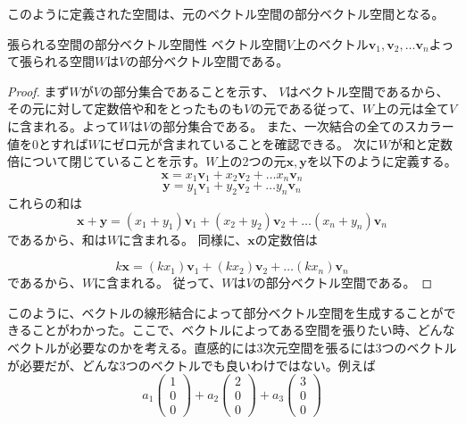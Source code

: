 このように定義された空間は、元のベクトル空間の部分ベクトル空間となる。
\begin{theorem*}{張られる空間の部分ベクトル空間性}
	ベクトル空間\(V\)上のベクトル\(\boldsymbol{v}_1,\boldsymbol{v}_2,\dots\boldsymbol{v}_n\)よって張られる空間\(W\)は\(V\)の部分ベクトル空間である。
\end{theorem*}
\begin{proof}
	まず\(W\)が\(V\)の部分集合であることを示す、
	\(V\)はベクトル空間であるから、その元に対して定数倍や和をとったものも\(V\)の元である従って、\(W\)上の元は全て\(V\)に含まれる。よって\( W\)は\(V\)の部分集合である。
	また、一次結合の全てのスカラー値を0とすれば\(W\)にゼロ元が含まれていることを確認できる。
	次に\( W\)が和と定数倍について閉じていることを示す。\(W\)上の2つの元\(\boldsymbol{x},\boldsymbol{y}\)を以下のように定義する。
	\begin{equation}
		\boldsymbol{x}=x_1\boldsymbol{v}_1+x_2\boldsymbol{v}_2+\dots x_n\boldsymbol{v}_n
	\end{equation}
	\begin{equation}
		\boldsymbol{y}=y_1\boldsymbol{v}_1+y_2\boldsymbol{v}_2+\dots y_n\boldsymbol{v}_n
	\end{equation}
	これらの和は
	\begin{equation}
		\boldsymbol{x}+\boldsymbol{y}=(x_1+y_1)\boldsymbol{v}_1+(x_2+y_2)\boldsymbol{v}_2+\dots (x_n+y_n)\boldsymbol{v}_n
	\end{equation}
	であるから、和は\(W\)に含まれる。
	同様に、\(\boldsymbol{x}\)の定数倍は

	\begin{equation}
		k\boldsymbol{x}=(kx_1)\boldsymbol{v}_1+(kx_2)\boldsymbol{v}_2+\dots (kx_n)\boldsymbol{v}_n
	\end{equation}
	であるから、\(W\)に含まれる。
	従って、\( W\)は\(V\)の部分ベクトル空間である。
\end{proof}
このように、ベクトルの線形結合によって部分ベクトル空間を生成することができることがわかった。ここで、ベクトルによってある空間を張りたい時、どんなベクトルが必要なのかを考える。直感的には3次元空間を張るには3つのベクトルが必要だが、どんな3つのベクトルでも良いわけではない。例えば
\begin{equation}
	a_1 \begin{pmatrix} 1 \\0 \\ 0 \end{pmatrix}+a_2\begin{pmatrix} 2 \\0 \\ 0 \end{pmatrix}+a_3\begin{pmatrix} 3 \\0 \\ 0 \end{pmatrix}
\end{equation}
